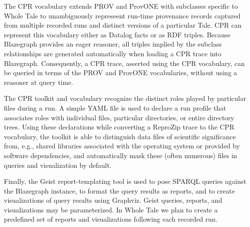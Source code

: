 The CPR vocabulary extends PROV and ProvONE \cite{provone_2015} with subclasses specific to Whole Tale to unambiguously represeent run-time provenance records captured from multiple recorded runs and distinct versions of a particular Tale. CPR can represent this vocabulary either as Datalog facts or as RDF triples. Because Blazegraph provides an eager reasoner, all triples implied by the subclass relationships are generated automatically when loading a CPR trace into Blazegraph. Consequently, a CPR trace, asserted using the CPR vocabulary, can be queried in terms of the PROV and ProvONE vocabularies, without using a reasoner at query time.

The CPR toolkit and vocabulary recognize the distinct roles played by particular files during a run. A simple YAML file is used to declare a run profile that associates roles with individual files, particular directories, or entire directory trees. Using these declarations while converting a ReproZip trace to the CPR vocabulary, the toolkit is able to distinguish data files of scientific significance from, e.g., shared libraries associated with the operating system or provided by software dependencies, and automatically mask these (often numerous) files in queries and visualization by default.

Finally, the Geist report-templating tool is used to pose SPARQL queries against the Blazegraph instance, to format the query results as reports, and to create visualizations of query results using Graphviz.  Geist queries, reports, and visualizations may be parameterized. In Whole Tale we plan to create a predefined set of reports and visualizations following each recorded run.
